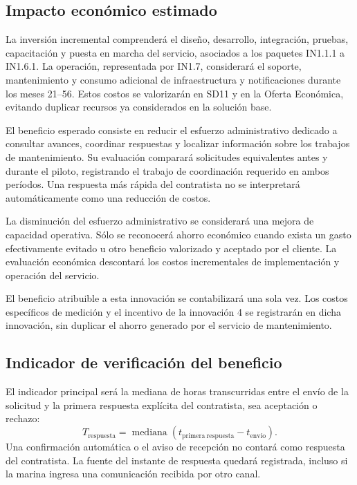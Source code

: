 \subsection{Impacto económico estimado}

La inversión incremental comprenderá el diseño, desarrollo, integración,
pruebas, capacitación y puesta en marcha del servicio, asociados a los
paquetes IN1.1.1 a IN1.6.1. La operación, representada por IN1.7,
considerará el soporte, mantenimiento y consumo adicional de
infraestructura y notificaciones durante los meses 21--56. Estos costos
se valorizarán en SD11 y en la Oferta Económica, evitando duplicar
recursos ya considerados en la solución base.

El beneficio esperado consiste en reducir el esfuerzo administrativo
dedicado a consultar avances, coordinar respuestas y localizar
información sobre los trabajos de mantenimiento. Su evaluación comparará
solicitudes equivalentes antes y durante el piloto, registrando el
trabajo de coordinación requerido en ambos períodos. Una respuesta
más rápida del contratista no se interpretará automáticamente como
una reducción de costos.

La disminución del esfuerzo administrativo se considerará una mejora
de capacidad operativa. Sólo se reconocerá ahorro económico cuando
exista un gasto efectivamente evitado u otro beneficio valorizado y
aceptado por el cliente. La evaluación económica descontará los costos
incrementales de implementación y operación del servicio.

El beneficio atribuible a esta innovación se contabilizará una sola
vez. Los costos específicos de medición y el incentivo de la
innovación 4 se registrarán en dicha innovación, sin duplicar el
ahorro generado por el servicio de mantenimiento.

\subsection{Indicador de verificación del beneficio}

El indicador principal será la mediana de horas transcurridas entre el envío de la solicitud y la primera respuesta explícita del contratista, sea aceptación o rechazo:
\[
 T_\mathrm{respuesta}=\operatorname{mediana}
 \left(t_\mathrm{primera\ respuesta}-t_\mathrm{envío}\right).
\]
Una confirmación automática o el aviso de recepción no contará como respuesta del contratista. La fuente del instante de respuesta quedará registrada, incluso si la marina ingresa una comunicación recibida por otro canal.

